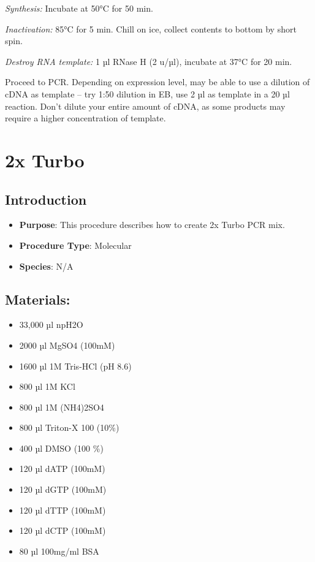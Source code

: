 \documentclass[
  letterpaper,
  DIV=11,
  numbers=noendperiod]{scrreprt}
\providecommand{\tightlist}{%
  \setlength{\itemsep}{0pt}\setlength{\parskip}{0pt}}\usepackage{longtable,booktabs,array}
\begin{document}
\emph{Synthesis:} Incubate at 50°C for 50 min.

\emph{Inactivation:} 85°C for 5 min. Chill on ice, collect contents to
bottom by short spin.

\emph{Destroy RNA template:} 1 µl RNase H (2 u/µl), incubate at 37°C for
20 min.

Proceed to PCR. Depending on expression level, may be able to use a
dilution of cDNA as template -- try 1:50 dilution in EB, use 2 µl as
template in a 20 µl reaction. Don't dilute your entire amount of cDNA,
as some products may require a higher concentration of template.

\hypertarget{sec-molec-2x_Turbo}{%
\chapter{2x Turbo}\label{sec-molec-2x_Turbo}}

\hypertarget{introduction-2}{%
\section{Introduction}\label{introduction-2}}

\begin{itemize}
\tightlist
\item
  \textbf{Purpose}: This procedure describes how to create 2x Turbo PCR
  mix.
\item
  \textbf{Procedure Type}: Molecular
\item
  \textbf{Species}: N/A
\end{itemize}

\hypertarget{materials-2}{%
\section{Materials:}\label{materials-2}}

\begin{itemize}
\tightlist
\item
  33,000 µl npH2O
\item
  2000 µl MgSO4 (100mM)
\item
  1600 µl 1M Tris-HCl (pH 8.6)
\item
  800 µl 1M KCl
\item
  800 µl 1M (NH4)2SO4
\item
  800 µl Triton-X 100 (10\%)
\item
  400 µl DMSO (100 \%)
\item
  120 µl dATP (100mM)
\item
  120 µl dGTP (100mM)
\item
  120 µl dTTP (100mM)
\item
  120 µl dCTP (100mM)
\item
  80 µl 100mg/ml BSA
\end{itemize}
\end{document}
